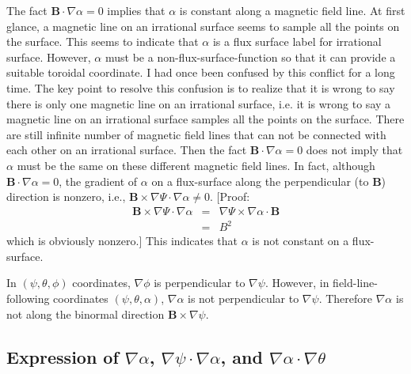 \documentclass{llncs}
\begin{document}
The fact $\mathbf{B} \cdot \nabla \alpha = 0$ implies that $\alpha$ is
constant along a magnetic field line. At first glance, a magnetic line on an
irrational surface seems to sample all the points on the surface. This seems
to indicate that $\alpha$ is a flux surface label for irrational surface.
However, $\alpha$ must be a non-flux-surface-function so that it can provide a
suitable toroidal coordinate. I had once been confused by this conflict for a
long time. The key point to resolve this confusion is to realize that it is
wrong to say there is only one magnetic line on an irrational surface, i.e. it
is wrong to say a magnetic line on an irrational surface samples all the
points on the surface. There are still infinite number of magnetic field lines
that can not be connected with each other on an irrational surface. Then the
fact $\mathbf{B} \cdot \nabla \alpha = 0$ does not imply that $\alpha$ must be
the same on these different magnetic field lines. In fact, although
$\mathbf{B} \cdot \nabla \alpha = 0$, the gradient of $\alpha$ on a
flux-surface along the perpendicular (to $\mathbf{B}$) direction is nonzero,
i.e., $\mathbf{B} \times \nabla \Psi \cdot \nabla \alpha \neq 0$. [Proof:
\begin{eqnarray}
  \mathbf{B} \times \nabla \Psi \cdot \nabla \alpha & = & \nabla \Psi \times
  \nabla \alpha \cdot \mathbf{B} \nonumber\\
  & = & B^2 
\end{eqnarray}
which is obviously nonzero.] This indicates that $\alpha$ is not constant on a
flux-surface.

In $(\psi, \theta, \phi)$ coordinates, $\nabla \phi$ is perpendicular to
$\nabla \psi$. However, in field-line-following coordinates $(\psi, \theta,
\alpha)$, $\nabla \alpha$ is not perpendicular to $\nabla \psi$. Therefore
$\nabla \alpha$ is not along the binormal direction $\mathbf{B} \times \nabla
\psi$.

\subsection{Expression of $\nabla \alpha$, $\nabla \psi \cdot \nabla \alpha$,
and $\nabla \alpha \cdot \nabla \theta$}
\end{document}
